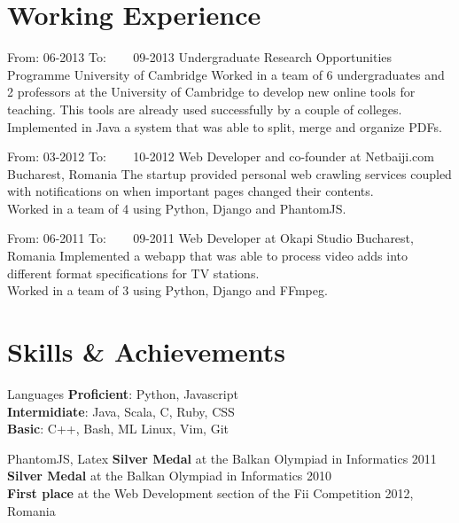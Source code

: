 \documentclass[]{friggeri-cv}
\begin{document}
\section{Working Experience}
\begin{entrylist}

  \entry
  {From: 06-2013} 
  {To: ~~~ 09-2013}
  {Undergraduate Research Opportunities Programme}
  {University of Cambridge}
  {
    Worked in a team of 6 undergraduates and 2 professors at the University of Cambridge to develop new online tools
    for teaching.
    This tools are already used successfully by a couple of colleges.\\

    Implemented in Java a system that was able to split, merge and organize PDFs.
  }

  \entry
  {From: 03-2012}
  {To: ~~~ 10-2012}
  {Web Developer and co-founder at Netbaiji.com}
  {Bucharest, Romania}
  {
    The startup provided personal web crawling services coupled with notifications on when important pages changed
    their contents. \\  

    Worked in a team of 4 using Python, Django and PhantomJS.
  }

  \entry
  {From: 06-2011}
  {To: ~~~ 09-2011}
  {Web Developer at Okapi Studio}
  {Bucharest, Romania}
  {
    Implemented a webapp that was able to process video adds into different format specifications for TV stations. \\

    Worked in a team of 3 using Python, Django and FFmpeg.
  }

\end{entrylist}

\section{Skills \& Achievements}
\begin{entrylist}
  \simpleentry
  {Languages}
  {
    \textbf{Proficient}:  Python, Javascript \\
    \textbf{Intermidiate}:  Java, Scala, C, Ruby, CSS \\
    \textbf{Basic}:  C++, Bash, ML
  }
   {
    Linux, Vim, Git
  }

   {
    PhantomJS, Latex
  }
   {
    \textbf{Silver Medal} at the Balkan Olympiad in Informatics 2011 \\
    \textbf{Silver Medal} at the Balkan Olympiad in Informatics 2010 \\
    \textbf{First place} at the Web Development section of the Fii Competition 2012, Romania
  }
\end{entrylist}
\end{document}

